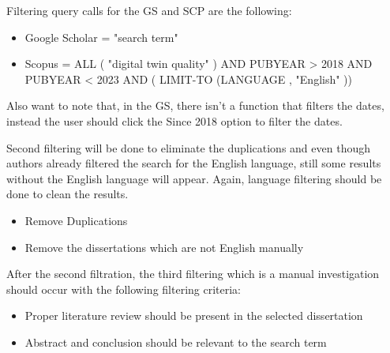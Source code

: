 \documentclass[9pt,conference]{IEEEtran}
\begin{document}
    Filtering query calls for the GS and SCP are the following:
    \begin{itemize}
        \item Google Scholar = "search term"
        \item Scopus = ALL ( "digital twin quality" ) AND PUBYEAR > 2018 AND PUBYEAR < 2023 AND ( LIMIT-TO (LANGUAGE , "English" )) 
    \end{itemize} 

    Also want to note that, in the GS, there isn't a function that filters the dates, instead the user should click the Since 2018 option to filter the dates.

    Second filtering will be done to eliminate the duplications and even though authors already filtered the search for the English language,
    still some results without the English language will appear. Again, language filtering should be done to clean the results.
    \begin{itemize}
        \item Remove Duplications
        \item Remove the dissertations which are not English manually
    \end{itemize}  
    
    After the second filtration, the third filtering which is a manual investigation should occur with the following filtering criteria:
    \begin{itemize}
        \item Proper literature review should be present in the selected dissertation
        \item Abstract and conclusion should be relevant to the search term
    \end{itemize}
    
\end{document}
